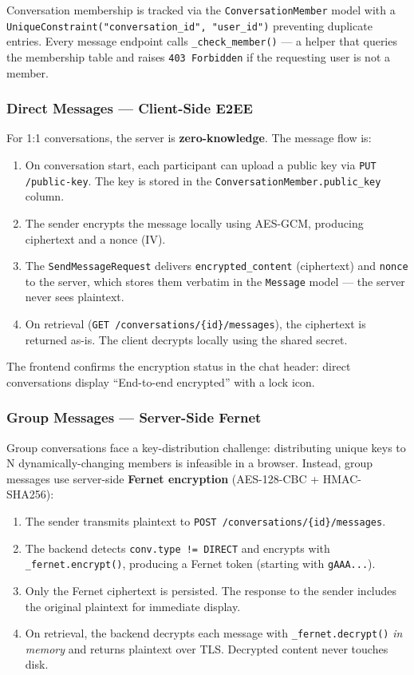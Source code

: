 Conversation membership is tracked via the \texttt{ConversationMember} model with a \texttt{UniqueConstraint("conversation\_id", "user\_id")} preventing duplicate entries. Every message endpoint calls \texttt{\_check\_member()} — a helper that queries the membership table and raises \texttt{403 Forbidden} if the requesting user is not a member.

\subsubsection{Direct Messages — Client-Side E2EE}

For 1:1 conversations, the server is \textbf{zero-knowledge}. The message flow is:

\begin{enumerate}
    \item On conversation start, each participant can upload a public key via \texttt{PUT /public-key}. The key is stored in the \texttt{ConversationMember.public\_key} column.
    \item The sender encrypts the message locally using AES-GCM, producing ciphertext and a nonce (IV).
    \item The \texttt{SendMessageRequest} delivers \texttt{encrypted\_content} (ciphertext) and \texttt{nonce} to the server, which stores them verbatim in the \texttt{Message} model — the server never sees plaintext.
    \item On retrieval (\texttt{GET /conversations/\{id\}/messages}), the ciphertext is returned as-is. The client decrypts locally using the shared secret.
\end{enumerate}

The frontend confirms the encryption status in the chat header: direct conversations display ``End-to-end encrypted'' with a lock icon.

\subsubsection{Group Messages — Server-Side Fernet}

Group conversations face a key-distribution challenge: distributing unique keys to N dynamically-changing members is infeasible in a browser. Instead, group messages use server-side \textbf{Fernet encryption} (AES-128-CBC + HMAC-SHA256):

\begin{enumerate}
    \item The sender transmits plaintext to \texttt{POST /conversations/\{id\}/messages}.
    \item The backend detects \texttt{conv.type != DIRECT} and encrypts with \texttt{\_fernet.encrypt()}, producing a Fernet token (starting with \texttt{gAAA...}).
    \item Only the Fernet ciphertext is persisted. The response to the sender includes the original plaintext for immediate display.
    \item On retrieval, the backend decrypts each message with \texttt{\_fernet.decrypt()} \emph{in memory} and returns plaintext over TLS. Decrypted content never touches disk.
\end{enumerate}


